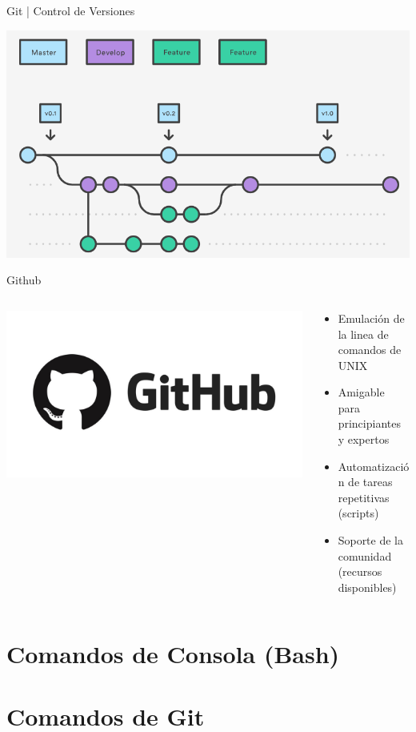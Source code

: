 \documentclass{beamer}
\begin{document}
\begin{frame}{Git | Control de Versiones}
	
	\includegraphics[scale=.35]{img/git_project.png}
	
\end{frame}

\begin{frame}{Github}
	\begin{columns}
		\begin{column}{.45\textwidth}
			\includegraphics[scale=.12]{img/github.jpeg}
		\end{column}
		\begin{column}{.55\textwidth}
			
			\begin{itemize}
				\item Emulación de la linea de comandos de UNIX
				\item Amigable para principiantes y expertos
				\item Automatización de tareas repetitivas (scripts)
				\item Soporte de la comunidad (recursos disponibles)
			\end{itemize}
		\end{column}
	\end{columns}
	
\end{frame}


\section{Comandos de Consola (Bash)}

\section{Comandos de Git}
\end{document}
